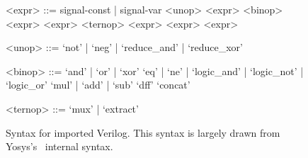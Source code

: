 \begin{figure}
\setlength{\grammarparsep}{3pt plus 1pt minus 1pt} %
\setlength{\grammarindent}{5em} %
\small{}
\begin{grammar}

<expr> ::= signal-const | signal-var  
\alt <unop> <expr> 
        \alt <binop> <expr> <expr>
        \alt <ternop> <expr> <expr> <expr>
        
<unop> ::=  `not' | `neg' | `reduce_and' | `reduce_xor'
    
<binop> ::= `and'  | `or' | `xor'
    \alt  `eq' | `ne' | `logic_and' | `logic_not' | `logic_or' 
    \alt  `mul' | `add' | `sub' 
    \alt  `dff'
    \alt `concat'

<ternop> ::=  `mux'  | `extract'

\end{grammar}

\caption{
Syntax for imported Verilog.
This syntax is largely drawn from
  Yosys's~\cite{wolf2013yosys} internal syntax.
}
\label{fig:verilog-syntax}
\end{figure}